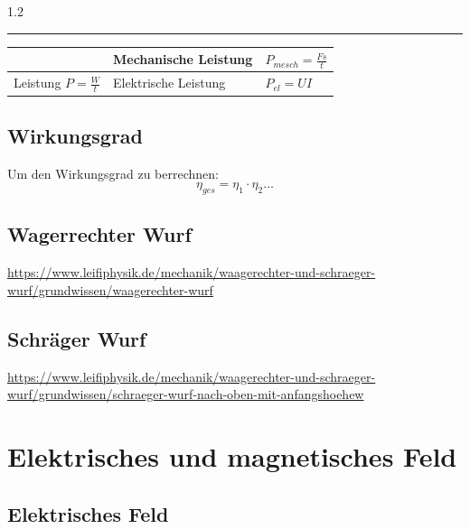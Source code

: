 \documentclass{article}
\newcommand{\Zeilenabstand}{1.2}
\newcommand{\absatz}{5mm}
\newcommand{\strich}{\vspace{\absatz}\hrule\vspace{\absatz}}
\begin{document}
\begin{spacing}{\Zeilenabstand}
\begin{center}
            \strich

            \begin{tabular}{|l| l| l|}
                \hline
                & Mechanische Leistung & $P_{mesch}=\frac{Fs}{t}$\\
                \hline
                Leistung $P=\frac{W}{t}$ & Elektrische Leistung & $P_{el}=UI$ \\
                \hline

            \end{tabular}

            \end{center}


            \subsection{Wirkungsgrad}

                Um den Wirkungsgrad zu berrechnen:
                \begin{equation}
                    \eta_{ges} = \eta_1 \cdot \eta_2 \ldots
                \end{equation}



            \subsection{Wagerrechter Wurf}

                \url{https://www.leifiphysik.de/mechanik/waagerechter-und-schraeger-wurf/grundwissen/waagerechter-wurf}


            \subsection{Schräger Wurf}

                \url{https://www.leifiphysik.de/mechanik/waagerechter-und-schraeger-wurf/grundwissen/schraeger-wurf-nach-oben-mit-anfangshoehew}


        \section{Elektrisches und magnetisches Feld}

            \subsection{Elektrisches Feld}


\end{spacing}
\end{document}
